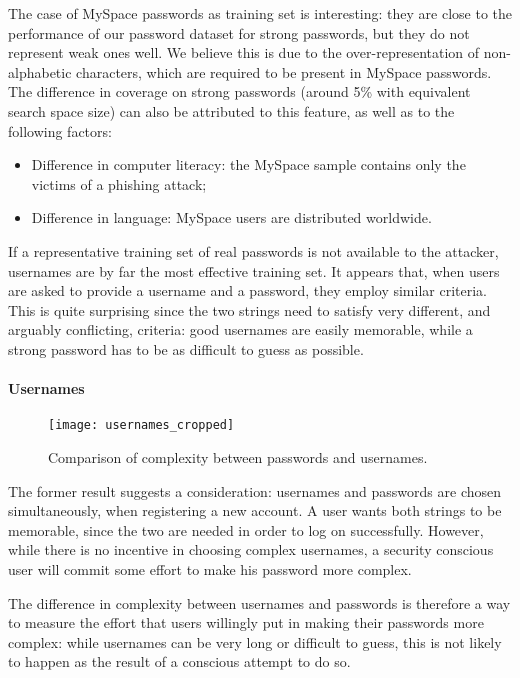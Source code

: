 \documentclass[a4paper,twocolumn]{article}
\begin{document}
The case of MySpace passwords as training set is interesting: they
are close to the performance of our password dataset for strong passwords,
but they do not represent weak ones well. We believe this is due to
the over-representation of non-alphabetic characters, which are required
to be present in MySpace passwords. The difference in coverage on
strong passwords (around 5\% with equivalent search space size) can
also be attributed to this feature, as well as to the following factors:
\begin{itemize}
\item Difference in computer literacy: the MySpace sample contains only
the victims of a phishing attack;
\item Difference in language: MySpace users are distributed worldwide.
\end{itemize}
If a representative training set of real passwords is not available
to the attacker, usernames are by far the most effective training
set. It appears that, when users are asked to provide a username and
a password, they employ similar criteria. This is quite surprising
since the two strings need to satisfy very different, and arguably
conflicting, criteria: good usernames are easily memorable, while
a strong password has to be as difficult to guess as possible.


\paragraph{Usernames}

\begin{figure}
\begin{centering}
\texttt{[image: usernames\_cropped]}
\par\end{centering}

\caption{\label{fig:Search-space-for}Comparison of complexity between passwords
and usernames.}

\end{figure}


The former result suggests a consideration: usernames and passwords
are chosen simultaneously, when registering a new account. A user
wants both strings to be memorable, since the two are needed in order
to log on successfully. However, while there is no incentive in choosing
complex usernames, a security conscious user will commit some effort
to make his password more complex.

The difference in complexity between usernames and passwords is therefore
a way to measure the effort that users willingly put in making their
passwords more complex: while usernames can be very long or difficult
to guess, this is not likely to happen as the result of a conscious
attempt to do so.
\end{document}
